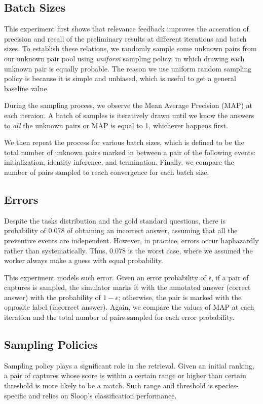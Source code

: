\subsection{Batch Sizes} %
\label{sub:batch_sizes}
This experiment first shows that relevance feedback improves the acceration of precision and recall of the preliminary results at different iterations and batch sizes. To establish these relations, we randomly sample some unknown pairs from our unknown pair pool using \emph{uniform} sampling policy, in which drawing each unknown pair is equally probable. The reason we use uniform random sampling policy is because it is simple and unbiased, which is useful to get a general baseline value.

During the sampling process, we observe the Mean Average Precision (MAP) at each iteraion. A batch of samples is iteratively drawn until we know the answers to \emph{all} the unknown pairs or MAP is equal to 1, whichever happens first.

We then repeat the process for various batch sizes, which is defined to be the total number of unknown pairs marked in between a pair of the following events: initialization, identity inference, and termination. Finally, we compare the number of pairs sampled to reach convergence for each batch size.

\subsection{Errors} %
\label{sub:errors}
Despite the tasks distribution and the gold standard questions, there is probability of 0.078 of obtaining an incorrect answer, assuming that all the preventive events are independent. However, in practice, errors occur haphazardly rather than systematically. Thus, 0.078 is the worst case, where we assumed the worker always make a guess with equal probability.

This experiment models such error. Given an error probability of $\epsilon$, if a pair of captures is sampled, the simulator marks it with the annotated answer (correct answer) with the probability of $1-\epsilon$; otherwise, the pair is marked with the opposite label (incorrect answer). Again, we compare the values of MAP at each iteration and the total number of pairs sampled for each error probability.

\subsection{Sampling Policies} %
\label{sub:sampling_policies}
Sampling policy plays a significant role in the retrieval. Given an initial ranking, a pair of captures whose score is within a certain range or higher than certain threshold is more likely to be a match. Such range and threshold is species-specific and relies on Sloop's classification performance.

